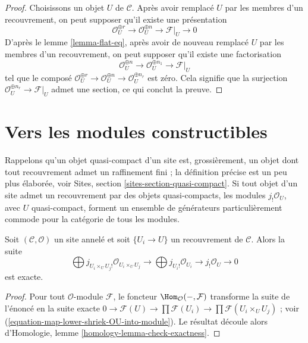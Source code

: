 \begin{proof}

Choisissons un objet $U$ de $\mathcal{C}$. Après avoir remplacé $U$ par les
membres d'un recouvrement, on peut supposer qu'il existe une présentation
$$
\mathcal{O}_U^{\oplus r} \to
\mathcal{O}_U^{\oplus n} \to \mathcal{F}|_U \to 0
$$
D'après le lemme \ref{lemma-flat-eq}, après avoir de nouveau remplacé $U$
par les membres d'un recouvrement, on peut supposer qu'il existe une
factorisation
$$
\mathcal{O}_U^{\oplus n} \to
\mathcal{O}_U^{\oplus n_1} \to \mathcal{F}|_U
$$
tel que le composé
$\mathcal{O}_U^{\oplus r} \to \mathcal{O}_U^{\oplus n}
\to \mathcal{O}_U^{\oplus n_r}$ est zéro. Cela signifie que la surjection $\mathcal{O}_U^{\oplus n_r} \to \mathcal{F}|_U$
admet une section, ce qui conclut la preuve.

\end{proof}











\section{Vers les modules constructibles}

\label{section-constructible}

\noindent
Rappelons qu'un objet quasi-compact d'un site est, grossièrement, un objet
dont tout recouvrement admet un raffinement fini ; la définition précise est
un peu plus élaborée, voir Sites, section
\ref{sites-section-quasi-compact}. Si tout objet d'un site admet un
recouvrement par des objets quasi-compacts, les modules
$j_!\mathcal{O}_U$, avec $U$ quasi-compact, forment un ensemble de
générateurs particulièrement commode pour la catégorie de tous les modules.

\begin{lemma}

\label{lemma-covering-gives-surjection}
Soit $(\mathcal{C}, \mathcal{O})$ un site annelé et soit
$\{U_i \to U\}$ un recouvrement de $\mathcal{C}$. Alors la suite
$$
\bigoplus j_{U_i \times_U U_j!}\mathcal{O}_{U_i \times_U U_j} \to
\bigoplus j_{U_i!}\mathcal{O}_{U_i} \to j_!\mathcal{O}_U \to 0
$$ est exacte.
\end{lemma}

\begin{proof}
Pour tout $\mathcal{O}$-module $\mathcal{F}$, le foncteur
$\Hom_\mathcal{O}(-, \mathcal{F})$ transforme la suite de l'énoncé en la
suite exacte $0 \to \mathcal{F}(U) \to \prod \mathcal{F}(U_i) \to
\prod \mathcal{F}(U_i \times_U U_j)$ ; voir
(\ref{equation-map-lower-shriek-OU-into-module}). Le résultat découle alors
d'Homologie, lemme \ref{homology-lemma-check-exactness}.
\end{proof}

